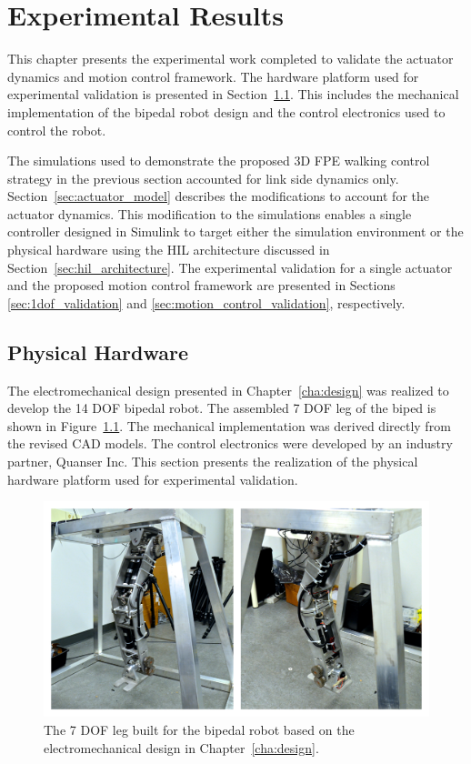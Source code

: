 \chapter{Experimental Results} %
\label{cha:experiments}

This chapter presents the experimental work completed to validate the actuator dynamics and motion control framework. The hardware platform used for experimental validation is presented in Section~\ref{sec:physical_hardware}. This includes the mechanical implementation of the bipedal robot design and the control electronics used to control the robot. 

The simulations used to demonstrate the proposed 3D FPE walking control strategy in the previous section accounted for link side dynamics only. Section~\ref{sec:actuator_model} describes the modifications to account for the actuator dynamics. This modification to the simulations enables a single controller designed in Simulink to target either the simulation environment or the physical hardware using the HIL architecture discussed in Section~\ref{sec:hil_architecture}. The experimental validation for a single actuator and the proposed motion control framework are presented in Sections \ref{sec:1dof_validation} and \ref{sec:motion_control_validation}, respectively. 

\section{Physical Hardware} %
\label{sec:physical_hardware}
The electromechanical design presented in Chapter~\ref{cha:design} was realized to develop the 14 DOF bipedal robot. The assembled 7 DOF leg of the biped is shown in Figure~\ref{fig:bipedleg}. The mechanical implementation was derived directly from the revised CAD models. The control electronics were developed by an industry partner, Quanser Inc. This section presents the realization of the physical hardware platform used for experimental validation. 

\begin{figure}[!h]
	\centering
    \includegraphics[scale=0.39]{fig/hardware/bipedleg.png} 
  	\caption{The 7 DOF leg built for the bipedal robot based on the electromechanical design in Chapter~\ref{cha:design}.}
	\label{fig:bipedleg}
\end{figure}


